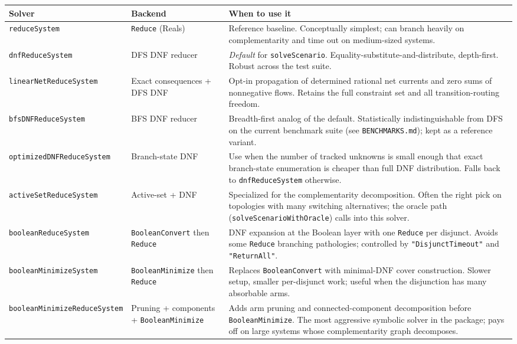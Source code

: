 \documentclass[11pt]{article}
\begin{document}
\begin{center}
\renewcommand{\arraystretch}{1.2}
\begin{longtable}{@{}p{4.0cm} p{3.2cm} p{8.0cm}@{}}
\toprule
\textbf{Solver} & \textbf{Backend} & \textbf{When to use it} \\
\midrule
\endhead
\texttt{reduceSystem} & \texttt{Reduce} (Reals) & Reference baseline. Conceptually simplest; can branch heavily on complementarity and time out on medium-sized systems. \\
\texttt{dnfReduceSystem} & DFS DNF reducer & \emph{Default} for \texttt{solveScenario}. Equality-substitute-and-distribute, depth-first. Robust across the test suite. \\
\texttt{linearNetReduceSystem} & Exact consequences + DFS DNF & Opt-in propagation of determined rational net currents and zero sums of nonnegative flows. Retains the full constraint set and all transition-routing freedom. \\
\texttt{bfsDNFReduceSystem} & BFS DNF reducer & Breadth-first analog of the default. Statistically indistinguishable from DFS on the current benchmark suite (see \texttt{BENCHMARKS.md}); kept as a reference variant. \\
\texttt{optimizedDNFReduceSystem} & Branch-state DNF & Use when the number of tracked unknowns is small enough that exact branch-state enumeration is cheaper than full DNF distribution. Falls back to \texttt{dnfReduceSystem} otherwise. \\
\texttt{activeSetReduceSystem} & Active-set + DNF & Specialized for the complementarity decomposition. Often the right pick on topologies with many switching alternatives; the oracle path (\texttt{solveScenarioWithOracle}) calls into this solver. \\
\texttt{booleanReduceSystem} & \texttt{BooleanConvert} then \texttt{Reduce} & DNF expansion at the Boolean layer with one \texttt{Reduce} per disjunct. Avoids some \texttt{Reduce} branching pathologies; controlled by \texttt{"DisjunctTimeout"} and \texttt{"ReturnAll"}. \\
\texttt{booleanMinimizeSystem} & \texttt{BooleanMinimize} then \texttt{Reduce} & Replaces \texttt{BooleanConvert} with minimal-DNF cover construction. Slower setup, smaller per-disjunct work; useful when the disjunction has many absorbable arms. \\
\texttt{booleanMinimizeReduceSystem} & Pruning + components + \texttt{BooleanMinimize} & Adds arm pruning and connected-component decomposition before \texttt{BooleanMinimize}. The most aggressive symbolic solver in the package; pays off on large systems whose complementarity graph decomposes. \\

\end{longtable}
\end{center}
\end{document}
